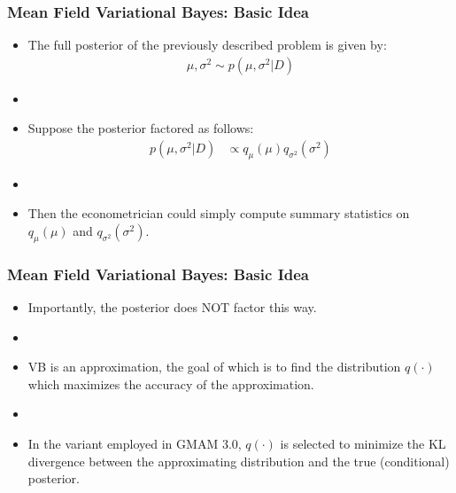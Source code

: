 \documentclass[10pt, compress]{beamer}
\begin{document}
\begin{frame}[fragile]
\frametitle{Mean Field Variational Bayes: Basic Idea}
\begin{itemize}
    \item The full posterior of the previously described problem is given by:
    \begin{align*}
        \mu,\sigma^2 \sim p(\mu,\sigma^2|D)
    \end{align*}
    \item []
    \item Suppose the posterior factored as follows:
    \begin{align*}
        p(\mu,\sigma^2|D)&\propto q_\mu(\mu)q_{\sigma^2}(\sigma^2) 
    \end{align*}
    \item []
    \item Then the econometrician could simply compute summary statistics on $q_\mu(\mu)$ and  $q_{\sigma^2}(\sigma^2)$.
\end{itemize}
\end{frame}

\begin{frame}[fragile]
\frametitle{Mean Field Variational Bayes: Basic Idea}
\begin{itemize}
    \item Importantly, the posterior does NOT factor this way. 
    \item []
    \item VB is an approximation, the goal of which is to find the distribution $q(\cdot)$ which maximizes the accuracy of the approximation.
    \item []
    \item In the variant employed in GMAM 3.0, $q(\cdot)$ is selected to minimize the KL divergence between the approximating distribution and the true (conditional) posterior.
\end{itemize}
\end{frame}
\end{document}
